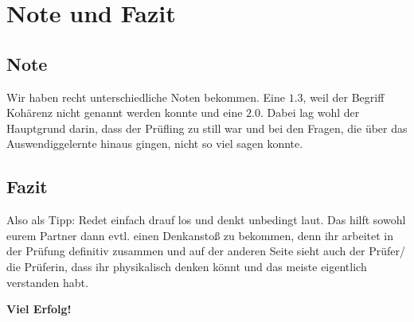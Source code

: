 \section{Note und Fazit}

\subsection{Note}

Wir haben recht unterschiedliche Noten bekommen. Eine $\num{1.3}$, weil der Begriff Kohärenz nicht genannt werden konnte und eine $\num{2.0}$. 
Dabei lag wohl der Hauptgrund darin, dass der Prüfling zu still war und bei den Fragen, die über das Auswendiggelernte hinaus gingen, nicht so viel sagen konnte. 

\subsection{Fazit}
Also als Tipp: Redet einfach drauf los und denkt unbedingt laut. Das hilft sowohl eurem Partner dann evtl. einen Denkanstoß zu bekommen, denn ihr arbeitet in der Prüfung definitiv zusammen und auf der anderen Seite sieht auch der Prüfer/ die Prüferin, dass ihr physikalisch denken könnt und das meiste eigentlich verstanden habt.

\noindent \textbf{Viel Erfolg!} 
